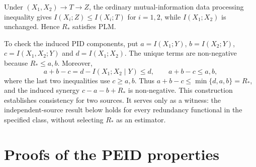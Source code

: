\documentclass[fleqn,10pt]{wlscirep}
\begin{document}
{Under $(X_1,X_2)\rightarrow T\rightarrow Z$, the ordinary mutual-information data processing inequality gives $I(X_i;Z)\leq I(X_i;T)$ for $i=1,2$, while $I(X_1;X_2)$ is unchanged. Hence $R_*$ satisfies PLM.

To check the induced PID components, put $a=I(X_1;Y)$, $b=I(X_2;Y)$, $c=I(X_1,X_2;Y)$ and $d=I(X_1;X_2)$. The unique terms are non-negative because $R_*\leq a,b$. Moreover,
\begin{equation}
a+b-c=d-I(X_1;X_2\mid Y)\leq d,
\qquad a+b-c\leq a,b,
\label{eq:pid_witness_lower_bound}
\end{equation}
where the last two inequalities use $c\geq a,b$. Thus $a+b-c\leq\min\{d,a,b\}=R_*$, and the induced synergy $c-a-b+R_*$ is non-negative. This construction establishes consistency for two sources. It serves only as a witness: the independent-source result below holds for every redundancy functional in the specified class, without selecting $R_*$ as an estimator.
}

\section{Proofs of the PEID properties}
\label{app:theoretical_proofs}
\end{document}
